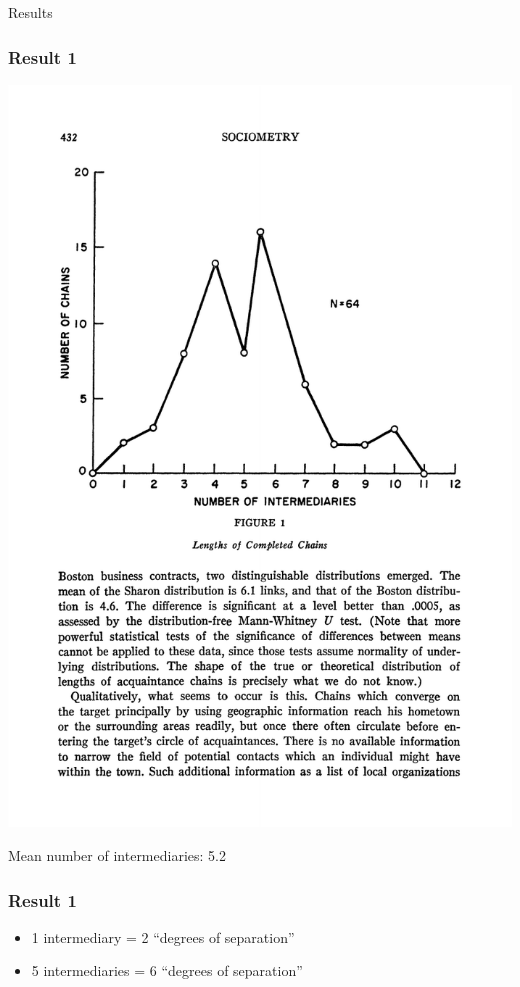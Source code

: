\documentclass[aspectratio=169]{beamer}
\begin{document}
\begin{frame}

Results

\end{frame}
\begin{frame}
\frametitle{Result 1}

\begin{center}
\includegraphics[height=0.7\textheight]{figures/travers_experimental_1969_fig1}
\end{center}

Mean number of intermediaries: 5.2\\ 

\end{frame}
\begin{frame}
\frametitle{Result 1}

\begin{itemize}
\item 1 intermediary = 2 ``degrees of separation''
\pause
\item 5 intermediaries = 6 ``degrees of separation''
\end{itemize}

\end{frame}
\end{document}
